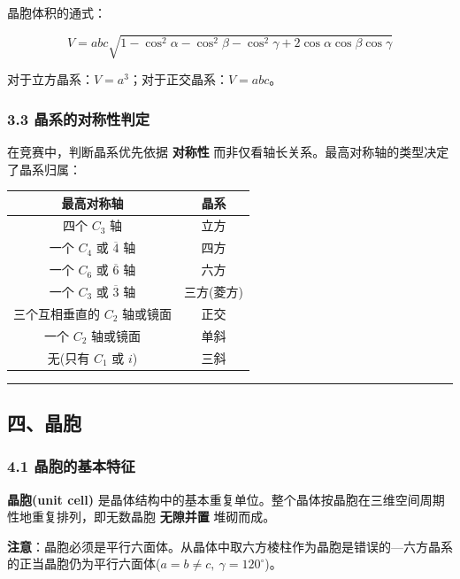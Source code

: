 \documentclass[a4paper,11pt]{ctexart}
\newcounter{none}
\newcommand{\箭}{\ensuremath{\rightarrow}}
\newcommand{\左箭}{\ensuremath{\leftarrow}}
\newcommand{\上箭}{\ensuremath{\uparrow}}
\newcommand{\下箭}{\ensuremath{\downarrow}}
\newcommand{\衡}{\ensuremath{\rightleftharpoons}}
\newcommand{\双箭}{\ensuremath{\leftrightarrow}}
\newcommand{\约等于}{\ensuremath{\approx}}
\newcommand{\小于等于}{\ensuremath{\leq}}
\newcommand{\大于等于}{\ensuremath{\geq}}
\newcommand{\不等于}{\ensuremath{\neq}}
\newcommand{\西格马}{\ensuremath{\sigma}}
\newcommand{\派}{\ensuremath{\pi}}
\begin{document}
晶胞体积的通式：

\[
V = abc\sqrt{1 - \cos^2\alpha - \cos^2\beta - \cos^2\gamma + 2\cos\alpha\cos\beta\cos\gamma}
\]

对于立方晶系：\(V = a^3\)；对于正交晶系：\(V = abc\)。

\subsubsection{3.3 晶系的对称性判定}\label{ux6676ux7cfbux7684ux5bf9ux79f0ux6027ux5224ux5b9a}

在竞赛中，判断晶系优先依据 \textbf{对称性} 而非仅看轴长关系。最高对称轴的类型决定了晶系归属：

{\def\LTcaptype{none} %
\begin{longtable}[]{@{}cc@{}}
\toprule\noalign{}
最高对称轴 & 晶系 \\
\midrule\noalign{}
\endhead
\bottomrule\noalign{}
\endlastfoot
四个 \(C_3\) 轴 & 立方 \\
一个 \(C_4\) 或 \(\overline{4}\) 轴 & 四方 \\
一个 \(C_6\) 或 \(\overline{6}\) 轴 & 六方 \\
一个 \(C_3\) 或 \(\overline{3}\) 轴 & 三方(菱方) \\
三个互相垂直的 \(C_2\) 轴或镜面 & 正交 \\
一个 \(C_2\) 轴或镜面 & 单斜 \\
无(只有 \(C_1\) 或 \(i\)) & 三斜 \\
\end{longtable}
}

\begin{center}\rule{0.5\linewidth}{0.5pt}\end{center}

\subsection{四、晶胞}\label{ux56dbux6676ux80de}

\subsubsection{4.1 晶胞的基本特征}\label{ux6676ux80deux7684ux57faux672cux7279ux5f81}

\textbf{晶胞(unit cell)} 是晶体结构中的基本重复单位。整个晶体按晶胞在三维空间周期性地重复排列，即无数晶胞 \textbf{无隙并置} 堆砌而成。

\textbf{注意}：晶胞必须是平行六面体。从晶体中取六方棱柱作为晶胞是错误的---六方晶系的正当晶胞仍为平行六面体(\(a = b \neq c,\ \gamma = 120^\circ\))。
\end{document}
